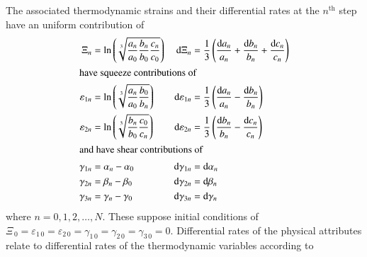 The associated thermo\-dynamic strains and their differential rates at the $n^{\text{th}}$ step have an uniform contribution of
\begin{subequations}
    \label{thermodynamicStrains}
    \begin{align}
    \Xi_n & = \ln \left( \sqrt[3]{\frac{a_n}{a_0} \frac{b_n}{b_0} \frac{c_n}{c_0}} \right) & 
    \mathrm{d} \Xi_n & = \frac{1}{3} \left( \frac{\mathrm{d} a_n}{a_n} + 
    \frac{\mathrm{d} b_n}{b_n} + \frac{\mathrm{d} c_n}{c_n} \right) \\
    \intertext{have squeeze contributions of}
    \varepsilon_{1n} & = \ln \left( \sqrt[3]{\frac{a_n}{a_0} \frac{b_0}{b_n}} \right) & 
    \mathrm{d} \varepsilon_{1n} & = \frac{1}{3} \left( \frac{\mathrm{d} a_n}{a_n} - 
    \frac{\mathrm{d} b_n}{b_n} \right) \\
    \varepsilon_{2n} & = \ln \left( \sqrt[3]{\frac{b_n}{b_0} \frac{c_0}{c_n}} \right) & 
    \mathrm{d} \varepsilon_{2n} & = \frac{1}{3} \left( \frac{\mathrm{d} b_n}{b_n} -
    \frac{\mathrm{d} c_n}{c_n} \right) \\
    \intertext{and have shear contributions of}
    \gamma_{1n} & = \alpha_n - \alpha_0 &
    \mathrm{d} \gamma_{1n} & = \mathrm{d} \alpha_n \\
    \gamma_{2n} & = \beta_n - \beta_0 &
    \mathrm{d} \gamma_{2n} & = \mathrm{d} \beta_n \\
    \gamma_{3n} & = \gamma_n - \gamma_0 &
    \mathrm{d} \gamma_{3n} & = \mathrm{d} \gamma_n
    \end{align}
\end{subequations}
where $n = 0, 1, 2, \ldots, N$.  These suppose initial conditions of $\Xi_{\,0} = \varepsilon_{1\,0} = \varepsilon_{2\,0} = \gamma_{1\,0} = \gamma_{2\,0} = \gamma_{3\,0} = 0$. Differential rates of the physical attributes relate to differential rates of the thermo\-dynamic variables according to

